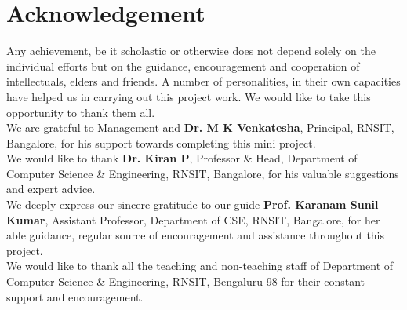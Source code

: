 \chapter*{Acknowledgement}%
%

Any achievement, be it scholastic or otherwise does not depend solely on the individual 
efforts but on the guidance, encouragement and cooperation of intellectuals, elders and 
friends. A number of personalities, in their own capacities have helped us in carrying out 
this project work. We would like to take this opportunity to thank them all.\\
We are grateful to Management and \textbf{Dr. M K Venkatesha}, Principal, RNSIT, Bangalore, for his 
support towards completing this mini project.\\
We would like to thank \textbf{Dr. Kiran P}, Professor \& Head, Department of Computer 
Science \& Engineering, RNSIT, Bangalore, for his valuable suggestions and expert advice.\\
We deeply express our sincere gratitude to our guide \textbf{Prof. Karanam Sunil Kumar}, Assistant 
Professor, Department of CSE, RNSIT, Bangalore, for her able guidance, regular source of 
encouragement and assistance throughout this project. \\
We would like to thank all the teaching and non-teaching staff of Department of 
Computer Science \& Engineering, RNSIT, Bengaluru-98 for their constant support and encouragement.

\thispagestyle{plain}
